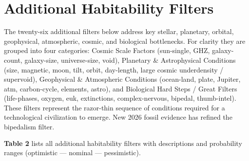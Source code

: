 \documentclass[12pt]{article}
\begin{document}
\section{Additional Habitability Filters}
The twenty-six additional filters below address key stellar, planetary, orbital, geophysical, atmospheric, cosmic, and biological bottlenecks. For clarity they are grouped into four categories: Cosmic Scale Factors (sun-single, GHZ, galaxy-count, galaxy-size, universe-size, void), Planetary \& Astrophysical Conditions (size, magnetic, moon, tilt, orbit, day-length, large cosmic underdensity / supervoid), Geophysical \& Atmospheric Conditions (ocean-land, plate, Jupiter, atm, carbon-cycle, elements, astro), and Biological Hard Steps / Great Filters (life-phases, oxygen, euk, extinctions, complex-nervous, bipedal, thumb-intel). These filters represent the razor-thin sequence of conditions required for a technological civilization to emerge. New 2026 fossil evidence has refined the bipedalism filter.

\textbf{Table 2} lists all additional habitability filters with descriptions and probability ranges (optimistic — nominal — pessimistic).
\end{document}
